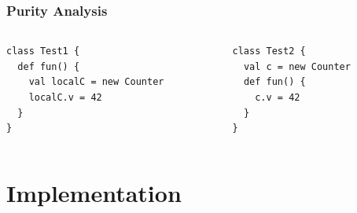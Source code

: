 \documentclass[hyperref={pdfpagelabels=false}]{beamer}
\begin{document}
\begin{frame}[fragile]
    \frametitle{Purity Analysis}
    \begin{columns}
      \begin{column}{0.4\textwidth}
\begin{lstlisting}
class Test1 {
  def fun() {
    val localC = new Counter
    localC.v = 42
  }
}
\end{lstlisting}
      \end{column}
      \begin{column}{0.6\textwidth}
\begin{lstlisting}
class Test2 {
  val c = new Counter
  def fun() {
    c.v = 42
  }
}
\end{lstlisting}
      \end{column}
    \end{columns}
\end{frame}

\section{Implementation}
\begin{frame}
\end{frame}
\end{document}
